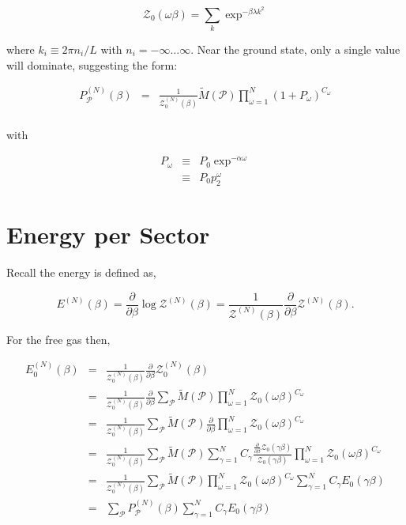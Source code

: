 \documentclass[aps,preprint,showpacs,superscriptaddress,groupedaddress]{revtex4}  %
\begin{document}
\begin{equation}
  \mathcal{Z}_{0}(\omega\beta) = \sum_{k} \exp^{-\beta \lambda k^2}
\end{equation}

where $k_{i} \equiv 2\pi n_{i}/L$ with $n_{i} = -\infty \dots \infty$. Near the ground state, only a single value will dominate, suggesting the form:

\begin{eqnarray}
  P_{\mathcal{P}}^{(N)}(\beta) &=& \frac{1}{\mathcal{Z}_{0}^{(N)}(\beta)} \tilde{M}(\mathcal{P}) \prod_{\omega=1}^{N} (1+P_{\omega})^{C_{\omega}} \\
\end{eqnarray}

with

\begin{eqnarray}
  P_{\omega} &\equiv& P_{0}\exp^{-\alpha \omega} \\
             &\equiv& P_{0}p_{2}^{\omega}
\end{eqnarray}

\section{Energy per Sector}

Recall the energy is defined as,

\begin{equation}
  E^{(N)}(\beta) = \frac{\partial}{\partial\beta} \log{\mathcal{Z}^{(N)}(\beta)} = \frac{1}{\mathcal{Z}^{(N)}(\beta)} \frac{\partial}{\partial\beta} \mathcal{Z}^{(N)}(\beta).
\end{equation}

For the free gas then,

\begin{eqnarray}
  E_{0}^{(N)}(\beta) &=& \frac{1}{\mathcal{Z}_{0}^{(N)}(\beta)} \frac{\partial}{\partial\beta} \mathcal{Z}_{0}^{(N)}(\beta) \\
                     &=& \frac{1}{\mathcal{Z}_{0}^{(N)}(\beta)} \frac{\partial}{\partial\beta} \sum_{\mathcal{P}} \tilde{M}(\mathcal{P}) \prod_{\omega=1}^{N} \mathcal{Z}_{0}(\omega\beta)^{C_{\omega}} \\
                     &=& \frac{1}{\mathcal{Z}_{0}^{(N)}(\beta)} \sum_{\mathcal{P}} \tilde{M}(\mathcal{P}) \frac{\partial}{\partial\beta} \prod_{\omega=1}^{N} \mathcal{Z}_{0}(\omega\beta)^{C_{\omega}} \\
                     &=& \frac{1}{\mathcal{Z}_{0}^{(N)}(\beta)} \sum_{\mathcal{P}} \tilde{M}(\mathcal{P}) \sum_{\gamma=1}^{N} C_{\gamma} \frac{\frac{\partial}{\partial\beta}\mathcal{Z}_{0}(\gamma\beta)}{\mathcal{Z}_{0}(\gamma\beta)} \prod_{\omega=1}^{N} \mathcal{Z}_{0}(\omega\beta)^{C_{\omega}} \\
                     &=& \frac{1}{\mathcal{Z}_{0}^{(N)}(\beta)} \sum_{\mathcal{P}} \tilde{M}(\mathcal{P}) \prod_{\omega=1}^{N} \mathcal{Z}_{0}(\omega\beta)^{C_{\omega}} \sum_{\gamma=1}^{N} C_{\gamma} E_{0}(\gamma\beta) \\
                     &=& \sum_{\mathcal{P}} P_{\mathcal{P}}^{(N)}(\beta) \sum_{\gamma=1}^{N} C_{\gamma} E_{0}(\gamma\beta)
\end{eqnarray}
\end{document}
